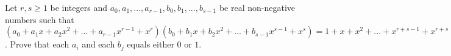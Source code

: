 Let $r, s \geq 1$ be integers and $a_{0}, a_{1}, . . . , a_{r-1}, b_{0}, b_{1}, . . . , b_{s-1} $ be real non-negative numbers such that $(a_0+a_1x+a_2x^2+. . .+a_{r-1}x^{r-1}+x^r)(b_0+b_1x+b_2x^2+. . .+b_{s-1}x^{s-1}+x^s) =1 +x+x^2+. . .+x^{r+s-1}+x^{r+s}$.
Prove that each $a_i$ and each $b_j$ equals either $0$ or $1$.